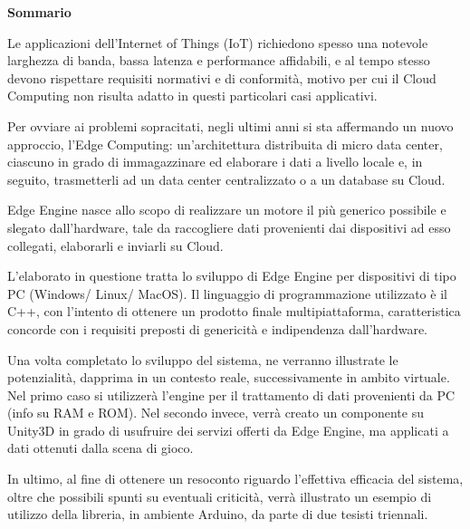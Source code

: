 \clearpage
\renewcommand{\headrulewidth}{0pt}
\begin{center}
	\huge{\textbf{Sommario}}
\end{center}
\null{}

\begin{spacing}{1.25}
	
Le applicazioni dell'Internet of Things (IoT) richiedono spesso una notevole larghezza di banda, bassa latenza e performance affidabili, e al tempo stesso devono rispettare requisiti normativi e di conformità, motivo per cui il Cloud Computing non risulta adatto in questi particolari casi applicativi.

Per ovviare ai problemi sopracitati, negli ultimi anni si sta affermando un nuovo approccio, l'Edge Computing: un’architettura distribuita di micro data center, ciascuno in grado di immagazzinare ed elaborare i dati a livello locale e, in seguito, trasmetterli ad un data center centralizzato o a un database su Cloud.

Edge Engine nasce allo scopo di realizzare un motore il più generico possibile e slegato dall'hardware, tale da raccogliere dati provenienti dai dispositivi ad esso collegati, elaborarli e inviarli su Cloud.

L'elaborato in questione tratta lo sviluppo di Edge Engine per dispositivi di tipo PC (Windows/ Linux/ MacOS). Il linguaggio di programmazione utilizzato è il C++, con l'intento di ottenere un prodotto finale multipiattaforma, caratteristica concorde con i requisiti preposti di genericità e indipendenza dall'hardware.

Una volta completato lo sviluppo del sistema, ne verranno illustrate le potenzialità, dapprima in un contesto reale, successivamente in ambito virtuale. Nel primo caso si utilizzerà l'engine per il trattamento di dati provenienti da PC (info su RAM e ROM). Nel secondo invece, verrà creato un componente su Unity3D in grado di usufruire dei servizi offerti da Edge Engine, ma applicati a dati ottenuti dalla scena di gioco.

In ultimo, al fine di ottenere un resoconto riguardo l'effettiva efficacia del sistema, oltre che possibili spunti su eventuali criticità, verrà illustrato un esempio di utilizzo della libreria, in ambiente Arduino, da parte di due tesisti triennali.
\end{spacing}
\null{}
\clearpage
\renewcommand{\headrulewidth}{0.5pt}

